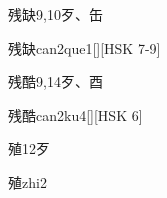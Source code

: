 \begin{Entry}{残缺}{9,10}{⽍、⽸}
  \begin{Phonetics}{残缺}{can2que1}[][HSK 7-9]
  \end{Phonetics}
\end{Entry}

\begin{Entry}{残酷}{9,14}{⽍、⾣}
  \begin{Phonetics}{残酷}{can2ku4}[][HSK 6]
  \end{Phonetics}
\end{Entry}

\begin{Entry}{殖}{12}{⽍}
  \begin{Phonetics}{殖}{zhi2}
  \end{Phonetics}
\end{Entry}


